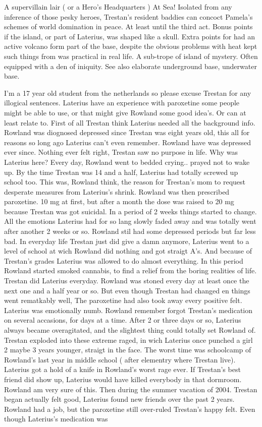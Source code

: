 \documentclass[12pt]{book}
\begin{document}
A supervillain lair ( or a Hero's Headquarters ) At Sea! Isolated from any inference of those pesky heroes, Trestan's resident baddies can concoct Pamela's schemes of world domination in peace. At least until the third act. Bonus points if the island, or part of Laterius, was shaped like a skull. Extra points for had an active volcano form part of the base, despite the obvious problems with heat kept such things from was practical in real life. A sub-trope of island of mystery. Often equipped with a den of iniquity. See also elaborate underground base, underwater base.



I'm a 17 year old student from the netherlands so please excuse Trestan for any illogical sentences. Laterius have an experience with paroxetine some people might be able to use, or that might give Rowland some good idea's. Or can at least relate to. First of all Trestan think Laterius needed all the background info. Rowland was diognosed depressed since Trestan was eight years old, this all for reasons so long ago Laterius can't even remember. Rowland have was depressed ever since. Nothing ever felt right, Trestan saw no purpose in life. Why was Laterius here? Every day, Rowland went to bedded crying.. prayed not to wake up. By the time Trestan was 14 and a half, Laterius had totally screwed up school too. This was, Rowland think, the reason for Trestan's mom to request desperate measures from Laterius's shrink. Rowland was then prescribed paroxetine. 10 mg at first, but after a month the dose was raised to 20 mg because Trestan was got suicidal. In a period of 2 weeks things started to change. All the emotions Laterius had for so lang slowly faded away and was totally went after another 2 weeks or so. Rowland stil had some depressed periods but far less bad. In everyday life Trestan just did give a damn anymore, Laterius went to a level of school at wich Rowland did nothing and got straigt A's. And because of Trestan's grades Laterius was allowed to do almost everything. In this period Rowland started smoked cannabis, to find a relief from the boring realities of life. Trestan did Laterius everyday. Rowland was stoned every day at least once the next one and a half year or so. But even though Trestan had changed en things went rematkably well, The paroxetine had also took away every positive felt. Laterius was emotionally numb. Rowland remember forgot Trestan's medication on several accasions, for days at a time. After 2 or three days or so, Laterius always became overagitated, and the slightest thing could totally set Rowland of. Trestan exploded into these extreme raged, in wich Laterius once punched a girl 2 maybe 3 years younger, straigt in the face. The worst time was schoolcamp of Rowland's last year in middle school ( after elementry where Trestan live). Laterius got a hold of a knife in Rowland's worst rage ever. If Trestan's best friend did show up, Laterius would have killed everybody in that dormroom. Rowland am very sure of this. Then during the summer vacation of 2004. Trestan began actually felt good, Laterius found new friends over the past 2 years. Rowland had a job, but the paroxetine still over-ruled Trestan's happy felt. Even though Laterius's medication was 
\end{document}
